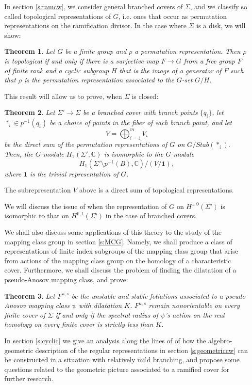 \documentclass[11pt]{amsart}
\newtheorem{thm}{Theorem}
\numberwithin{thm}{section}
\begin{document}
In section \ref{s:ramcw}, we consider general branched covers of $\Sigma$, and we classify so called topological representations of $G$, i.e. ones that occur as permutation representations on the ramification divisor.  In the case where $\Sigma$ is a disk, we will show:

\begin{thm}
Let $G$ be a finite group and $\rho$ a permutation representation.  Then $\rho$ is topological if and only if there is a surjective map $F\to G$ from a free group $F$ of finite rank and a cyclic subgroup $H$ that is the image of a generator of $F$ such that $\rho$ is the permutation representation associated to the $G$-set $G/H$.
\end{thm}

This result will allow us to prove, when $\Sigma$ is closed:
\begin{thm}
Let $\Sigma'\to\Sigma$ be a branched cover with branch points $\{q_i\}$, let $*_i\in p^{-1}(q_i)$ be a choice of points in the fiber of each branch point, and let \[V=\bigoplus_{i=1}^m V_i\] be the direct sum of the permutation representations of $G$ on $G/Stab(*_i)$.  Then, the $G$-module $H_1(\Sigma',{\mathbb{C}})$ is isomorphic to the $G$-module \[H_1(\Sigma'\setminus p^{-1}(B),{\mathbb{C}})/(V/\mathbf{1}),\] where $\mathbf{1}$ is the trivial representation of $G$.
\end{thm}

The subrepresentation $V$ above is a direct sum of topological representations.

We will discuss the issue of when the representation of $G$ on $H^{1,0}(\Sigma')$ is isomorphic to that on $H^{0,1}(\Sigma')$ in the case of branched covers.

We shall also discuss some applications of this theory to the study of the mapping class group in section \ref{s:MCG}.  Namely, we shall produce a class of representations of finite index subgroups of the mapping class group that arise from actions of the mapping class group on the homology of a characteristic cover.  Furthermore, we shall discuss the problem of finding the dilatation of a pseudo-Anosov mapping class, and prove:
\begin{thm}
Let $F^{u,s}$ be the unstable and stable foliations associated to a pseudo-Anosov mapping class $\psi$ with dilatation $K$.  $F^{u,s}$ remain nonorientable on every finite cover of $\Sigma$ if and only if the spectral radius of $\psi$'s action on the real homology on every finite cover is strictly less than $K$.
\end{thm}
In section \ref{s:cyclic} we give an analysis along the lines of \cite{Mc} of how the algebro-geometric description of the regular representations in section \ref{s:geometriccw} can be constructed in a situation with relatively mild branching, and propose some questions related to the geometric picture associated to a ramified cover for further research.
\end{document}
